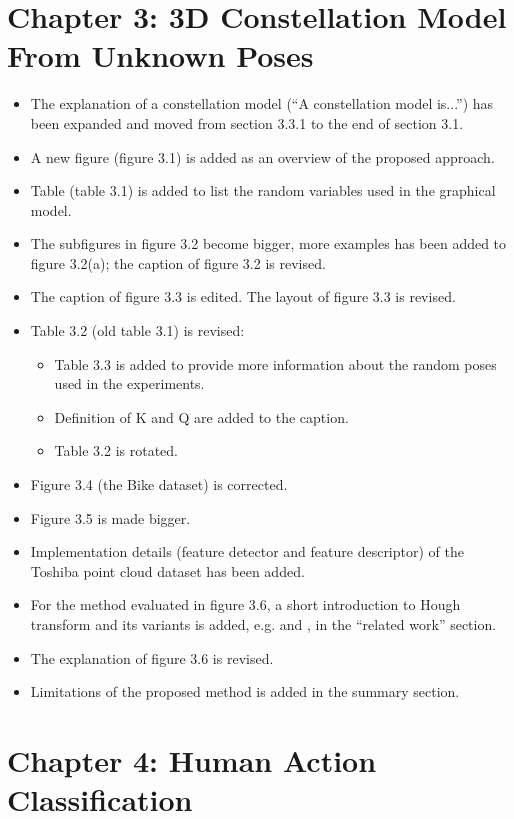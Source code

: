 \documentclass[10pt, a4paper]{article}
\begin{document}
\section{Chapter 3: 3D Constellation Model From Unknown Poses}
\begin{itemize}
\item The explanation of a constellation model (``A constellation model is...'') has been expanded and moved from section 3.3.1 to the end of section 3.1. 
\item A new figure (figure 3.1) is added as an overview of the proposed approach. 
\item Table (table 3.1) is added to list the random variables used in the graphical model.
\item The subfigures in figure 3.2 become bigger, more examples has been added to figure 3.2(a); the caption of figure 3.2 is revised.
\item The caption of figure 3.3 is edited. The layout of figure 3.3 is revised.
\item Table 3.2 (old table 3.1) is revised:
	\begin{itemize}
	\item Table 3.3 is added to provide more information about the random poses used in the experiments.
	\item Definition of K and Q are added to the caption.
	\item Table 3.2 is rotated.
	\end{itemize}
\item Figure 3.4 (the Bike dataset) is corrected.
\item Figure 3.5 is made bigger.
\item Implementation details (feature detector and feature descriptor) of the Toshiba point cloud dataset has been added.
\item For the method evaluated in figure 3.6, a short introduction to Hough transform and its variants is added, e.g. \cite{Woodford2013} and \cite{Barinova2010}, in the ``related work'' section.
\item The explanation of figure 3.6 is revised.
\item Limitations of the proposed method is added in the summary section.
\end{itemize}

\section{Chapter 4: Human Action Classification}
\end{document}
